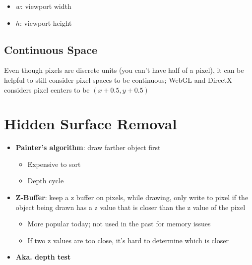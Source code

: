   \begin{itemize}
    \item $ w $: viewport width
    \item $ h $: viewport height
  \end{itemize}

  \subsection{Continuous Space}

    Even though pixels are discrete units (you can't have half of a pixel),
    it can be helpful to still consider pixel spaces to be continuous; WebGL
    and DirectX considers pixel centers to be
    $ \left( x + 0.5, y + 0.5 \right) $

\section{Hidden Surface Removal}

  \begin{itemize}
    \item \textbf{Painter's algorithm}: draw farther object first
    \begin{itemize}
      \item Expensive to sort
      \item Depth cycle
    \end{itemize}

    \item \textbf{Z-Buffer}: keep a z buffer on pixels, while drawing,
    only write to pixel if the object being drawn has a z value that is
    closer than the z value of the pixel
    \begin{itemize}
      \item More popular today; not used in the past for memory issues
      \item If two z values are too close, it's hard to determine which is
      closer
    \end{itemize}

    \item \textbf{Aka. depth test}
  \end{itemize}
